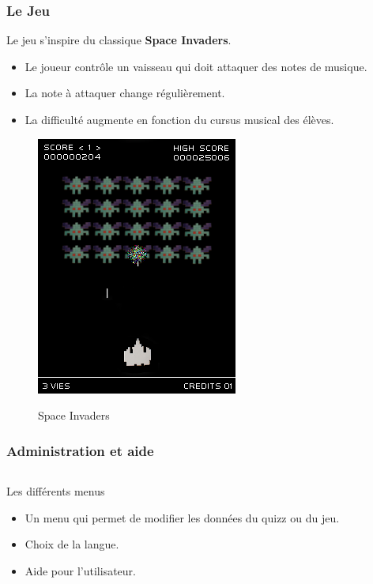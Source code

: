 \begin{frame}
  \frametitle{Le Jeu}
  Le jeu s'inspire du classique \textbf{Space Invaders}.
  \begin{itemize}
    \item Le joueur contrôle un vaisseau qui doit attaquer des notes de musique.    \item La note à attaquer change régulièrement.
    \item La difficulté augmente en fonction du cursus musical des élèves.  
  \end{itemize}

  \begin{figure}[!h]
    \centering
    \includegraphics[height = 0.5\textheight]{img/Space_Invaders.png}
    \label{Space Invaders} 
    \caption{Space Invaders}
  \end{figure}
\end{frame}

\begin{frame}
  \frametitle{Administration et aide}
 \begin{columns}[t]
    \begin{column}{10cm}
      \begin{exampleblock}{Les différents menus}
	\begin{itemize}
        \item Un menu qui permet de modifier les données du quizz ou du jeu.
        \item Choix de la langue.
        \item Aide pour l'utilisateur.
        \end{itemize}
      \end{exampleblock} 
    \end{column}
  \end{columns}  
\end{frame}

